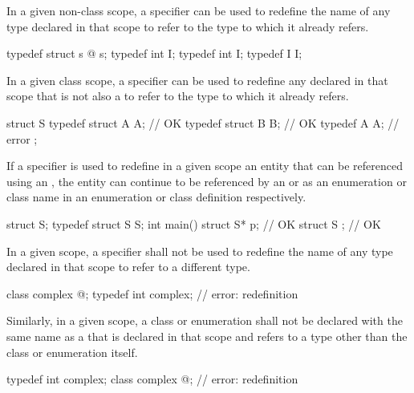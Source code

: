 \pnum
{}%
In a given non-class scope, a  specifier can be used to
redefine the name of any type declared in that scope to refer to the
type to which it already refers.
\begin{example}

\begin{codeblock}
typedef struct s { @\commentellip@ } s;
typedef int I;
typedef int I;
typedef I I;
\end{codeblock}
\end{example}

\pnum
In a given class scope, a  specifier can be used to
redefine any  declared in that scope that is not
also a  to refer to the type to which it already
refers.
\begin{example}

\begin{codeblock}
struct S {
  typedef struct A { } A;       // OK
  typedef struct B B;           // OK
  typedef A A;                  // error
};
\end{codeblock}
\end{example}

\pnum
If a  specifier is used to redefine in a given scope an
entity that can be referenced using an ,
the entity can continue to be referenced by an
 or as an enumeration or class name
in an enumeration or class definition respectively. \begin{example}
\begin{codeblock}
struct S;
typedef struct S S;
int main() {
  struct S* p;                  // OK
}
struct S { };                   // OK
\end{codeblock}
\end{example}

\pnum
In a given scope, a  specifier shall not be used to
redefine the name of any type declared in that scope to refer to a
different type.
\begin{example}
\begin{codeblock}
class complex { @\commentellip@ };
typedef int complex;            // error: redefinition
\end{codeblock}
\end{example}

\pnum
Similarly, in a given scope, a class or enumeration shall not be
declared with the same name as a  that is
declared in that scope and refers to a type other than the class or
enumeration itself.
\begin{example}
\begin{codeblock}
typedef int complex;
class complex { @\commentellip@ };    // error: redefinition
\end{codeblock}
\end{example}

